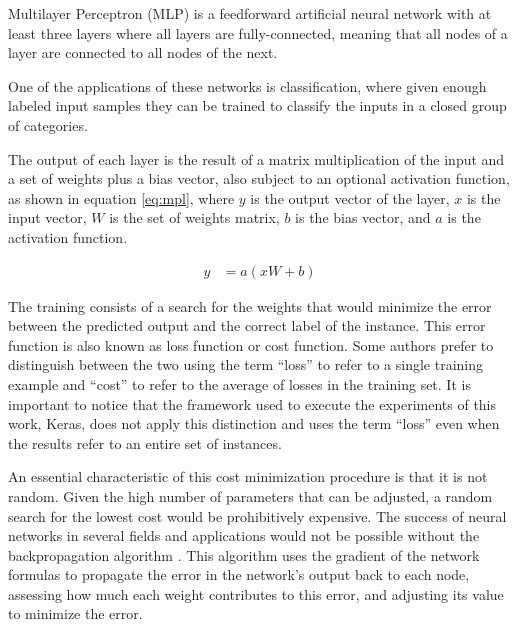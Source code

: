 Multilayer Perceptron (MLP) \cite{rosenblatt_perceptron:_1958} is a feedforward artificial neural network with at least three layers where all layers are fully-connected, meaning that all nodes of a layer are connected to all nodes of the next.

One of the applications of these networks is classification, where given enough labeled input samples they can be trained to classify the inputs in a closed group of categories.

The output of each layer is the result of a matrix multiplication of the input and a set of weights plus a bias vector, also subject to an optional activation function, as shown in equation \ref{eq:mpl}, where $y$ is the output vector of the layer, $x$ is the input vector, $W$ is the set of weights matrix, $b$ is the bias vector, and $a$ is the activation function.

\begin{align}
\label{eq:mpl}     
y &= a(x W + b)
\end{align}


The training consists of a search for the weights that would minimize the error between the predicted output and the correct label of the instance. This error function is also known as loss function or cost function. Some authors prefer to distinguish between the two using the term ``loss'' to refer to a single training example and ``cost'' to refer to the average of losses in the training set. 
It is important to notice that the framework used to execute the experiments of this work, Keras, does not apply this distinction and uses the term ``loss'' even when the results refer to an entire set of instances.


An essential characteristic of this cost minimization procedure is that it is not random. Given the high number of parameters that can be adjusted, a random search for the lowest cost would be prohibitively expensive.
The success of neural networks in several fields and applications would not be possible without the backpropagation algorithm \cite{rumelhart_general_1986}. This algorithm uses the gradient of the network formulas to propagate the error in the network's output back to each node, assessing how much each weight contributes to this error, and adjusting its value to minimize the error.